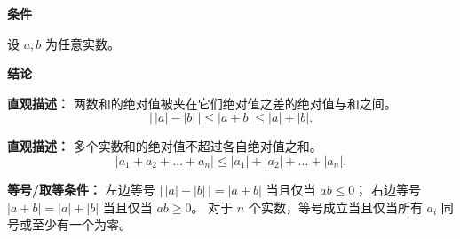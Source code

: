 \begin{statementbox}

\textbf{\textcolor{CStatement}{条件}}
\begin{description}[style=nextline, leftmargin=2.8em, labelsep=0.5em, itemsep=0.35em]
    \item[\textbf{\textcolor{CStatement}{条件 1（实数变量）：}}] 设 $a, b$ 为任意实数。
\end{description}

\textbf{\textcolor{CStatement}{结论}}
\begin{description}[style=nextline, leftmargin=2.8em, labelsep=0.5em, itemsep=0.45em]
    \item[\textbf{\textcolor{CStatement}{结论一（双边不等式）：}}]
    \textbf{\textcolor{CStatement}{直观描述：}} 两数和的绝对值被夹在它们绝对值之差的绝对值与和之间。
    \[
    \bigl|\,|a| - |b|\,\bigr| \leq |a + b| \leq |a| + |b|.
    \]

    \item[\textbf{\textcolor{CStatement}{推广结论（多实数形式）：}}]
    \textbf{\textcolor{CStatement}{直观描述：}} 多个实数和的绝对值不超过各自绝对值之和。
    \[
    |a_1 + a_2 + \dots + a_n| \leq |a_1| + |a_2| + \dots + |a_n|.
    \]
\end{description}

\textbf{\textcolor{CStatement}{等号/取等条件：}} 
左边等号 $\bigl|\,|a| - |b|\,\bigr| = |a + b|$ 当且仅当 $ab \leq 0$；
右边等号 $|a + b| = |a| + |b|$ 当且仅当 $ab \geq 0$。
对于 $n$ 个实数，等号成立当且仅当所有 $a_i$ 同号或至少有一个为零。

\end{statementbox}
